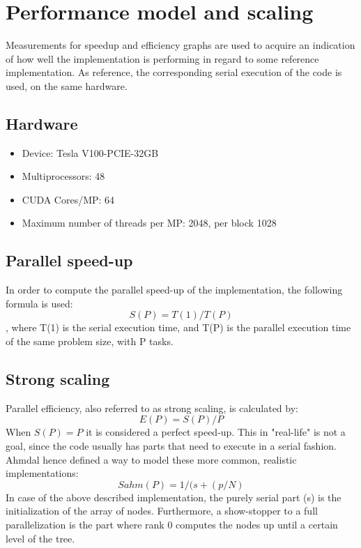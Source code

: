 \documentclass[11pt]{article}
\begin{document}
\section{Performance model and scaling}
Measurements for speedup and efficiency graphs are used to acquire an indication of how well the implementation is performing in regard to some reference
implementation. As reference, the corresponding serial execution of the code is used, on the same hardware.
\subsection{Hardware}
\begin{itemize}
\item Device: Tesla V100-PCIE-32GB
\item Multiprocessors: 48
\item CUDA Cores/MP: 64
\item Maximum number of threads per MP: 2048, per block 1028
\end{itemize}
\subsection{Parallel speed-up}
In order to compute the parallel speed-up of the implementation, the following formula is used:
\begin{equation} \label{eqn}
	S(P) = {T(1) / T(P)} 
\end{equation}
, where T(1) is the serial execution time, and T(P) is the parallel execution time of the same problem size, with P tasks.
\subsection{Strong scaling}
Parallel efficiency, also referred to as strong scaling, is calculated by:
\begin{equation} \label{eqn}
	E(P) = {S(P) / P} 
\end{equation}
When $S(P)=P$ it is considered a perfect speed-up. This in "real-life" is not a goal, since the code usually has parts that need to execute in a serial fashion. Ahmdal hence defined a way to model these more common, realistic implementations:
\begin{equation} \label{eqn}
	Sahm(P) = {1 /(s + (p/N)} 
\end{equation}
In case of the above described implementation, the purely serial part (s) is the initialization of the array of nodes. Furthermore, a show-stopper to a full parallelization is the part where rank 0 computes the nodes up until a certain level of the tree.
\end{document}

